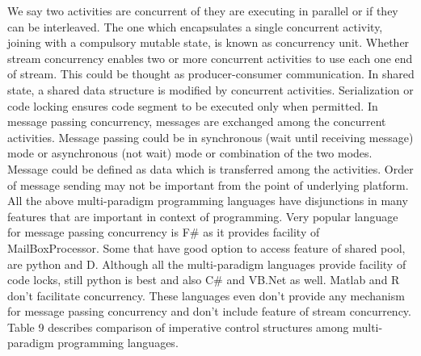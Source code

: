 \documentclass{sig-alternate}
\begin{document}
	We say two activities are concurrent of they are executing in parallel or if they can be interleaved. The one which encapsulates a single concurrent activity, joining with a compulsory mutable state, is known as concurrency unit. Whether stream concurrency enables two or more concurrent activities to use each one end of stream. This could be thought as producer-consumer communication. In shared state, a shared data structure is modified by concurrent activities. Serialization or code locking ensures code segment to be executed only when permitted. In message passing concurrency, messages are exchanged among the concurrent activities. Message passing could be in synchronous (wait until receiving message) mode or asynchronous (not wait) mode or combination of the two modes. Message could be defined as data which is transferred among the activities. Order of message sending may not be important from the point of underlying platform.
	\newline
	All the above multi-paradigm programming languages have disjunctions in many features that are important in context of programming. Very popular language for message passing concurrency is F\# as it provides facility of MailBoxProcessor. Some that have good option to access feature of shared pool, are python and D. Although all the multi-paradigm languages provide facility of code locks, still python is best and also C\# and VB.Net as well. Matlab and R don't facilitate concurrency. These languages even don't provide any mechanism for message passing concurrency and don't include feature of stream concurrency. Table 9 describes comparison of imperative control structures among multi-paradigm programming languages. 
	
\end{document}
